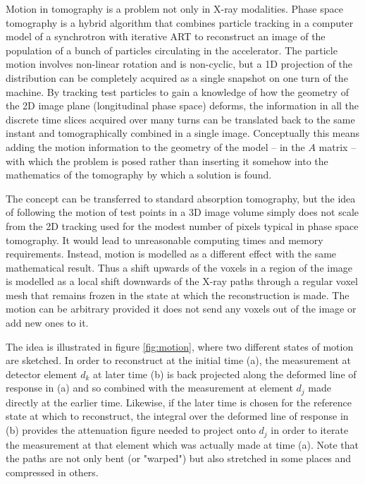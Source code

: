 Motion in tomography is a problem not only in X-ray modalities.  Phase space tomography \cite{pstweb} is a hybrid algorithm that combines particle tracking in a computer model of a synchrotron with iterative ART to reconstruct an image of the population of a bunch of particles circulating in the accelerator.  The particle motion involves non-linear rotation and is non-cyclic, but a 1D projection of the distribution can be completely acquired as a single snapshot on one turn of the machine.  By tracking test particles to gain a knowledge of how the geometry of the 2D image plane (longitudinal phase space) deforms, the information in all the discrete time slices acquired over many turns can be translated back to the same instant and tomographically combined in a single image.  Conceptually this means adding the motion information to the geometry of the model -- in the $A$ matrix -- with which the problem is posed rather than inserting it somehow into the mathematics of the tomography by which a solution is found.

The concept can be transferred to standard absorption tomography, but the idea of following the motion of test points in a 3D image volume simply does not scale from the 2D tracking used for the modest number of pixels typical in phase space tomography.  It would lead to unreasonable computing times and memory requirements.  Instead, motion is modelled as a different effect with the same mathematical result.  Thus a shift upwards of the voxels in a region of the image is modelled as a local shift downwards of the X-ray paths through a regular voxel mesh that remains frozen in the state at which the reconstruction is made.  The motion can be arbitrary provided it does not send any voxels out of the image or add new ones to it.

The idea is illustrated in figure \ref{fig:motion}, where two different states of motion are sketched.  In order to reconstruct at the initial time (a), the measurement at detector element $d_k$ at later time (b) is back projected along the deformed line of response in (a) and so combined with the measurement at element $d_j$ made directly at the earlier time.  Likewise, if the later time is chosen for the reference state at which to reconstruct, the integral over the deformed line of response in (b) provides the attenuation figure needed to project onto $d_j$ in order to iterate the measurement at that element which was actually made at time (a).  Note that the paths are not only bent (or "warped") but also stretched in some places and compressed in others.

